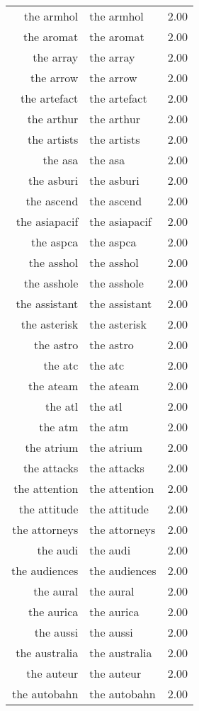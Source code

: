 \begin{table}[ht]
\begin{tabular}{rlr}
  the armhol & the armhol & 2.00 \\ 
  the aromat & the aromat & 2.00 \\ 
  the array & the array & 2.00 \\ 
  the arrow & the arrow & 2.00 \\ 
  the artefact & the artefact & 2.00 \\ 
  the arthur & the arthur & 2.00 \\ 
  the artists & the artists & 2.00 \\ 
  the asa & the asa & 2.00 \\ 
  the asburi & the asburi & 2.00 \\ 
  the ascend & the ascend & 2.00 \\ 
  the asiapacif & the asiapacif & 2.00 \\ 
  the aspca & the aspca & 2.00 \\ 
  the asshol & the asshol & 2.00 \\ 
  the asshole & the asshole & 2.00 \\ 
  the assistant & the assistant & 2.00 \\ 
  the asterisk & the asterisk & 2.00 \\ 
  the astro & the astro & 2.00 \\ 
  the atc & the atc & 2.00 \\ 
  the ateam & the ateam & 2.00 \\ 
  the atl & the atl & 2.00 \\ 
  the atm & the atm & 2.00 \\ 
  the atrium & the atrium & 2.00 \\ 
  the attacks & the attacks & 2.00 \\ 
  the attention & the attention & 2.00 \\ 
  the attitude & the attitude & 2.00 \\ 
  the attorneys & the attorneys & 2.00 \\ 
  the audi & the audi & 2.00 \\ 
  the audiences & the audiences & 2.00 \\ 
  the aural & the aural & 2.00 \\ 
  the aurica & the aurica & 2.00 \\ 
  the aussi & the aussi & 2.00 \\ 
  the australia & the australia & 2.00 \\ 
  the auteur & the auteur & 2.00 \\ 
  the autobahn & the autobahn & 2.00 \\ 

\end{tabular}
\end{table}
